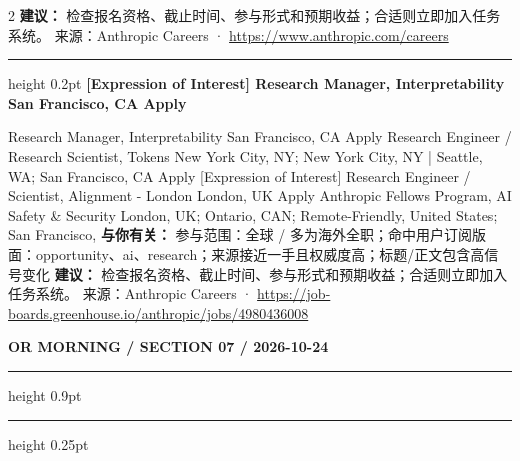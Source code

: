 \documentclass[10.5pt]{ctexart}
\begin{document}
\begin{multicols}{2}
\textbf{建议：} 检查报名资格、截止时间、参与形式和预期收益；合适则立即加入任务系统。
{\footnotesize\color{ormuted} 来源：Anthropic Careers · \url{https://www.anthropic.com/careers}}
\vspace{2mm}
\hrule height 0.2pt
\vspace{2mm}
{\large\bfseries [Expression of Interest] Research Manager, Interpretability San Francisco, CA Apply}\par
[Expression of Interest] Research Manager, Interpretability San Francisco, CA Apply Research Engineer / Research Scientist, Tokens New York City, NY; New York City, NY | Seattle, WA; San Francisco, CA Apply [Expression of Interest] Research Engineer / Scientist, Alignment - London London, UK Apply Anthropic Fellows Program, AI Safety \& Security London, UK; Ontario, CAN; Remote-Friendly, United States; San Francisco, 
\textbf{与你有关：} 参与范围：全球 / 多为海外全职；命中用户订阅版面：opportunity、ai、research；来源接近一手且权威度高；标题/正文包含高信号变化
\textbf{建议：} 检查报名资格、截止时间、参与形式和预期收益；合适则立即加入任务系统。
{\footnotesize\color{ormuted} 来源：Anthropic Careers · \url{https://job-boards.greenhouse.io/anthropic/jobs/4980436008}}
\end{multicols}
\newpage
{\small\bfseries OR MORNING / SECTION 07 / 2026-10-24}
\vspace{2mm}
\hrule height 0.9pt
\vspace{1.5mm}
\hrule height 0.25pt
\vspace{4mm}
\end{document}
